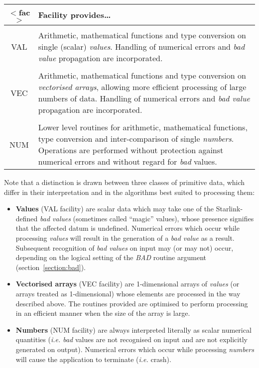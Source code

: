 \documentclass[11pt,nolof]{starlink}
\providecommand{\name}[1]{\mbox{#1}}
\providecommand{\fortvar}[1]{\mbox{\emph{#1}}}
\begin{document}
\begin{center}
\begin{tabular}{c|p{33em}}

\textbf{$<$fac$>$} & \textbf{Facility provides\ldots } \\
\hline
\\
VAL & Arithmetic, mathematical functions and type conversion on single
(scalar) \emph{values}.
Handling of numerical errors and \emph{bad value} propagation are
incorporated.\\
\\
VEC & Arithmetic, mathematical functions and type conversion on \emph{vectorised arrays}, allowing more efficient processing of large numbers of
data.
Handling of numerical errors and \emph{bad value} propagation are
incorporated.\\
\\
NUM & Lower level routines for arithmetic, mathematical functions, type
conversion and inter-comparison of single \emph{numbers}.
Operations are performed without protection against numerical errors and
without regard for \emph{bad} values.
\\
\end{tabular}
\end{center}

Note that a distinction is drawn between three classes of primitive data,
which differ in their interpretation and in the algorithms best suited to
processing them:

\begin{itemize}

\item \textbf{Values} (\name{VAL} facility) are scalar data which may take one
of the Starlink-defined \emph{bad values} (sometimes called ``magic''
values), whose presence signifies that the affected datum is undefined.
Numerical errors which occur while processing \emph{values} will result in
the generation of a \emph{bad value} as a result.
Subsequent recognition of \emph{bad values} on input may (or may not) occur,
depending on the logical setting of the \fortvar{BAD} routine argument
(section~\ref{section:bad}).

\item \textbf{Vectorised arrays} (\name{VEC} facility) are 1-dimensional arrays
of \emph{values} (or arrays treated as 1-dimensional) whose elements are
processed in the way described above.
The routines provided are optimised to perform processing in an efficient
manner when the size of the array is large.

\item \textbf{Numbers} (\name{NUM} facility) are always interpreted literally
as scalar numerical quantities (\emph{i.e. bad} values are not recognised on
input and are not explicitly generated on output).
Numerical errors which occur while processing \emph{numbers} will cause the
application to terminate (\emph{i.e.} crash).

\end{itemize}
\end{document}
